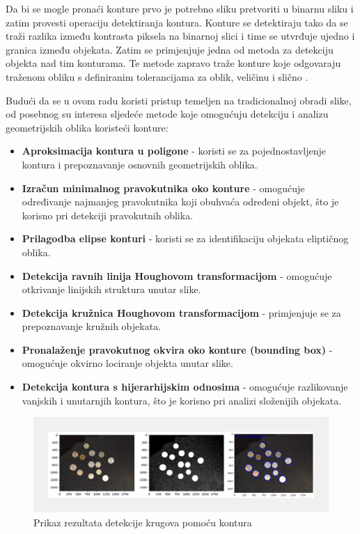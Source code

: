 \documentclass{foi}
\begin{document}
Da bi se mogle pronaći konture prvo je potrebno sliku pretvoriti u binarnu sliku i zatim provesti operaciju detektiranja kontura. Konture se detektiraju tako da se traži razlika između kontrasta piksela na binarnoj slici i time se utvrđuje ujedno i granica između objekata. Zatim se primjenjuje jedna od metoda za detekciju objekta nad tim konturama. Te metode zapravo traže konture koje odgovaraju traženom obliku s definiranim tolerancijama za oblik, veličinu i slično \cite{konturesShapes}.

\begin{flushleft}
Budući da se u ovom radu koristi pristup temeljen na tradicionalnoj obradi slike, od posebnog su interesa sljedeće metode koje omogućuju detekciju i analizu geometrijskih oblika koristeći konture:

\begin{itemize}
\item \textbf{Aproksimacija kontura u poligone} - koristi se za pojednostavljenje kontura i prepoznavanje osnovnih geometrijskih oblika.
\item \textbf{Izračun minimalnog pravokutnika oko konture} - omogućuje određivanje najmanjeg pravokutnika koji obuhvaća određeni objekt, što je korisno pri detekciji pravokutnih oblika.
\item \textbf{Prilagodba elipse konturi} - koristi se za identifikaciju objekata eliptičnog oblika.
\item \textbf{Detekcija ravnih linija Houghovom transformacijom} - omogućuje otkrivanje linijskih struktura unutar slike.
\item \textbf{Detekcija kružnica Houghovom transformacijom} - primjenjuje se za prepoznavanje kružnih objekata.
\item \textbf{Pronalaženje pravokutnog okvira oko konture (bounding box)} - omogućuje okvirno lociranje objekta unutar slike.
\item \textbf{Detekcija kontura s hijerarhijskim odnosima} - omogućuje razlikovanje vanjskih i unutarnjih kontura, što je korisno pri analizi složenijih objekata.
\end{itemize}
\end{flushleft}

\begin{figure}[H]
    \centering
    \includegraphics[width=1.0\linewidth]{slike/shapeDetection.png}
    \caption{\centering Prikaz rezultata detekcije krugova pomoću kontura \cite{segvsdetection_2}}
\end{figure}
\end{document}

